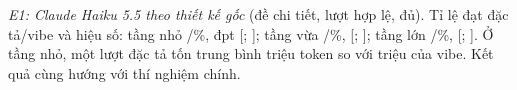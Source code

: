 \textit{E1: Claude Haiku 5.5 theo thiết kế gốc} (đề chi tiết, \NumEOneRuns{} lượt hợp lệ, đủ). Tỉ lệ
đạt đặc tả/vibe và hiệu số: tầng nhỏ \NumEOneSmallSpecPct{}/\NumEOneSmallVibePct{}\%, \NumEOneSmallDiffPp{}
đpt [\NumEOneSmallLowPp{}; \NumEOneSmallHighPp{}]; tầng vừa \NumEOneMediumSpecPct{}/\NumEOneMediumVibePct{}\%,
\NumEOneMediumDiffPp{} [\NumEOneMediumLowPp{}; \NumEOneMediumHighPp{}]; tầng lớn
\NumEOneLargeSpecPct{}/\NumEOneLargeVibePct{}\%, \NumEOneLargeDiffPp{} [\NumEOneLargeLowPp{};
\NumEOneLargeHighPp{}]. Ở tầng nhỏ, một lượt đặc tả tốn trung bình \NumEOneSmallSpecTokensM{} triệu token so
với \NumEOneSmallVibeTokensM{} triệu của vibe. Kết quả cùng hướng với thí nghiệm chính.
